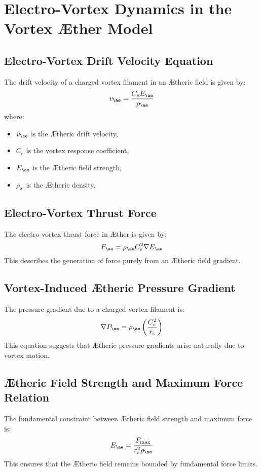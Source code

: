 \section{Electro-Vortex Dynamics in the Vortex Æther Model}

\subsection{Electro-Vortex Drift Velocity Equation}
The drift velocity of a charged vortex filament in an Ætheric field is given by:
\begin{equation}
    v_{\ae} = \frac{C_e E_{\ae}}{\rho_\text{\ae}}
\end{equation}
where:
\begin{itemize}
    \item $v_{\ae}$ is the Ætheric drift velocity,
    \item $C_e$ is the vortex response coefficient,
    \item $E_{\ae}$ is the Ætheric field strength,
    \item $\rho_\text{\ae}$ is the Ætheric density.
\end{itemize}

\subsection{Electro-Vortex Thrust Force}
The electro-vortex thrust force in Æther is given by:
\begin{equation}
    F_{\ae} = \rho_\text{\ae} C_e^2 \nabla E_{\ae}
\end{equation}
This describes the generation of force purely from an Ætheric field gradient.

\subsection{Vortex-Induced Ætheric Pressure Gradient}
The pressure gradient due to a charged vortex filament is:
\begin{equation}
    \nabla P_{\ae} = \rho_\text{\ae} \left( \frac{C_e^2}{r_c} \right)
\end{equation}
This equation suggests that Ætheric pressure gradients arise naturally due to vortex motion.

\subsection{\AE theric Field Strength and Maximum Force Relation}
The fundamental constraint between Ætheric field strength and maximum force is:
\begin{equation}
    E_{\ae} = \frac{F_{\max}}{r_c^2 \rho_\text{\ae}}
\end{equation}
This ensures that the Ætheric field remains bounded by fundamental force limits.

